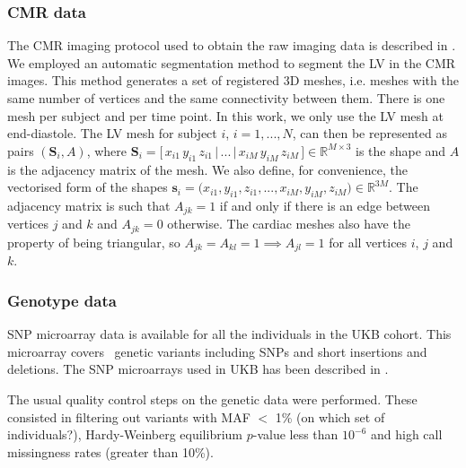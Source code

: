\subsubsection{CMR data}
The CMR imaging protocol used to obtain the raw imaging data is described in \cite{ref_ukbb_cmr}. 
We employed an automatic segmentation method \cite{ref_rahman} to segment the LV in the CMR images. This method generates a set of registered 3D meshes, i.e. meshes with the same number of vertices and the same connectivity between them. There is one mesh per subject and per time point. In this work, we only use the LV mesh at end-diastole. The LV mesh for subject $i$, $i=1,...,N$, can then be represented as pairs $(\textbf{S}_i, A)$, where $\textbf{S}_i=\big[\,x_{i1}\,y_{i1}\,z_{i1}\,|\,...\,|\,x_{iM}\,y_{iM}\,z_{iM}\,\big]\in \mathbb{R}^{M\times 3}$ is the shape and $A$ is the adjacency matrix of the mesh. We also define, for convenience, the vectorised form of the shapes $\textbf{s}_i=\big(x_{i1},y_{i1},z_{i1},...,x_{iM},y_{iM},z_{iM}\big)\in \mathbb{R}^{3M}$. The adjacency matrix is such that $A_{jk}=1$ if and only if there is an edge between vertices $j$ and $k$ and $A_{jk}=0$ otherwise. The cardiac meshes also have the property of being triangular, so $A_{jk}=A_{kl}=1\implies A_{jl}=1$ for all vertices $i$, $j$ and $k$.

\subsubsection{Genotype data}
SNP microarray data is available for all the individuals in the UKB cohort. This microarray covers \NCALLS\, genetic variants including SNPs and short insertions and deletions. 
The SNP microarrays used in UKB has been described in \cite{ref_ukbb_genetics}.

The usual quality control steps on the genetic data were performed. These consisted in filtering out variants with MAF $<$ 1\% (on which set of individuals?), Hardy-Weinberg equilibrium $p$-value less than $10^{-6}$ and high call missingness rates (greater than 10\%). 




